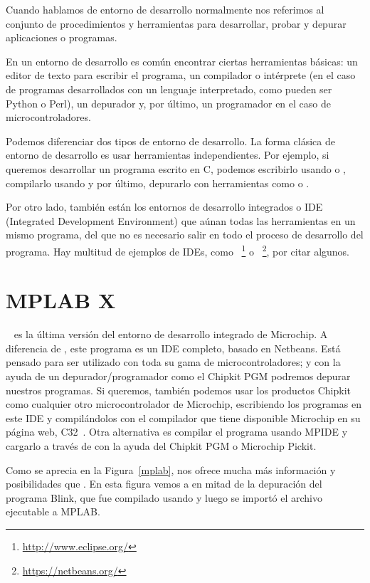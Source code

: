 Cuando hablamos de entorno de desarrollo normalmente nos referimos al conjunto de procedimientos y herramientas para desarrollar, probar y depurar aplicaciones o programas. 

En un entorno de desarrollo es común encontrar ciertas herramientas básicas: un editor de texto para escribir el programa, un compilador o intérprete (en el caso de programas desarrollados con un lenguaje interpretado, como pueden ser Python o Perl), un depurador y, por último, un programador en el caso de microcontroladores.

Podemos diferenciar dos tipos de entorno de desarrollo. La forma clásica de entorno de desarrollo es usar herramientas independientes. Por ejemplo, si queremos desarrollar un programa escrito en C, podemos escribirlo usando  o , compilarlo usando  y por último, depurarlo con herramientas como  o .

Por otro lado, también están los entornos de desarrollo integrados o IDE (Integrated Development Environment) que aúnan todas las herramientas en un mismo programa, del que no es necesario salir en todo el proceso de desarrollo del programa. Hay multitud de ejemplos de IDEs, como ~\footnote{\url{http://www.eclipse.org/}} o ~\footnote{\url{https://netbeans.org/}}, por citar algunos.

\section{MPLAB X} 
~\cite{website:mplab} es la última versión del entorno de desarrollo integrado de Microchip. A diferencia de
, este programa es un IDE completo, basado en Netbeans.  Está pensado para ser utilizado con toda su gama de microcontroladores; y con la ayuda de un depurador/programador como el Chipkit PGM podremos depurar nuestros programas.  Si queremos, también podemos usar los productos Chipkit como cualquier otro microcontrolador de Microchip, escribiendo los programas en este IDE y compilándolos con el compilador que tiene disponible Microchip en su página web, C32~\cite{website:c32}.  Otra alternativa es compilar el programa usando MPIDE y cargarlo a través de  con la ayuda del Chipkit PGM o Microchip Pickit.

Como se aprecia en la Figura~\ref{mplab},  nos ofrece mucha más información y posibilidades que .  En esta figura vemos a  en mitad de la depuración del programa Blink, que fue compilado usando  y luego se importó el archivo ejecutable a MPLAB.\@


